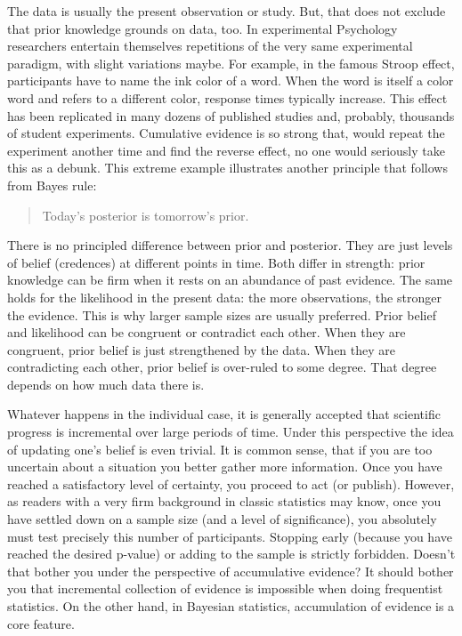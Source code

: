 \documentclass[]{svmono}
\begin{document}
The data is usually the present observation or study. But, that does not
exclude that prior knowledge grounds on data, too. In experimental
Psychology researchers entertain themselves repetitions of the very same
experimental paradigm, with slight variations maybe. For example, in the
famous Stroop effect, participants have to name the ink color of a word.
When the word is itself a color word and refers to a different color,
response times typically increase. This effect has been replicated in
many dozens of published studies and, probably, thousands of student
experiments. Cumulative evidence is so strong that, would repeat the
experiment another time and find the reverse effect, no one would
seriously take this as a debunk. This extreme example illustrates
another principle that follows from Bayes rule:

\begin{quote}
Today's posterior is tomorrow's prior.
\end{quote}

There is no principled difference between prior and posterior. They are
just levels of belief (credences) at different points in time. Both
differ in strength: prior knowledge can be firm when it rests on an
abundance of past evidence. The same holds for the likelihood in the
present data: the more observations, the stronger the evidence. This is
why larger sample sizes are usually preferred. Prior belief and
likelihood can be congruent or contradict each other. When they are
congruent, prior belief is just strengthened by the data. When they are
contradicting each other, prior belief is over-ruled to some degree.
That degree depends on how much data there is.

Whatever happens in the individual case, it is generally accepted that
scientific progress is incremental over large periods of time. Under
this perspective the idea of updating one's belief is even trivial. It
is common sense, that if you are too uncertain about a situation you
better gather more information. Once you have reached a satisfactory
level of certainty, you proceed to act (or publish). However, as readers
with a very firm background in classic statistics may know, once you
have settled down on a sample size (and a level of significance), you
absolutely must test precisely this number of participants. Stopping
early (because you have reached the desired p-value) or adding to the
sample is strictly forbidden. Doesn't that bother you under the
perspective of accumulative evidence? It should bother you that
incremental collection of evidence is impossible when doing frequentist
statistics. On the other hand, in Bayesian statistics, accumulation of
evidence is a core feature.
\end{document}
